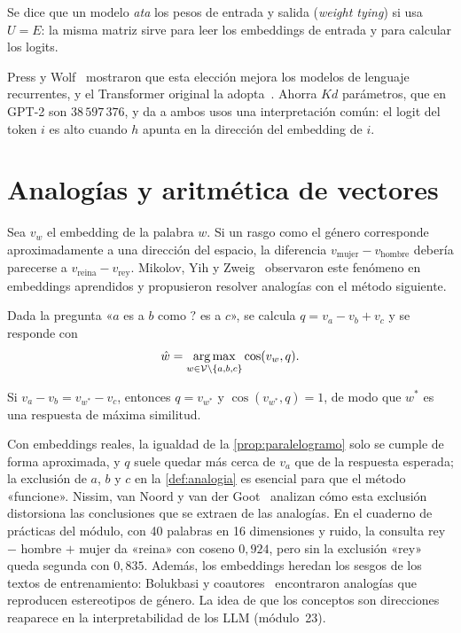 \begin{definicion}
Se dice que un modelo \emph{ata} los pesos de entrada y salida (\emph{weight tying}) si usa $U=E$: la misma matriz sirve para leer los embeddings de entrada y para calcular los logits.
\end{definicion}

Press y Wolf~\cite{press} mostraron que esta elección mejora los modelos de lenguaje recurrentes, y el Transformer original la adopta~\cite[§3.4]{vaswani}. Ahorra $Kd$ parámetros, que en GPT-2 son $38\,597\,376$, y da a ambos usos una interpretación común: el logit del token $i$ es alto cuando $h$ apunta en la dirección del embedding de $i$.

\section{Analogías y aritmética de vectores}

Sea $v_w$ el embedding de la palabra $w$. Si un rasgo como el género corresponde aproximadamente a una dirección del espacio, la diferencia $v_{\text{mujer}}-v_{\text{hombre}}$ debería parecerse a $v_{\text{reina}}-v_{\text{rey}}$. Mikolov, Yih y Zweig~\cite{mikolov-b} observaron este fenómeno en embeddings aprendidos y propusieron resolver analogías con el método siguiente.

\begin{definicion}\label{def:analogia}
Dada la pregunta «$a$ es a $b$ como $?$ es a $c$», se calcula $q=v_a-v_b+v_c$ y se responde con
\[
\hat w=\operatorname*{arg\,max}_{w\in\mathcal{V}\setminus\{a,b,c\}}\cos(v_w,q).
\]
\end{definicion}

\begin{proposicion}\label{prop:paralelogramo}
Si $v_a-v_b=v_{w^{*}}-v_c$, entonces $q=v_{w^{*}}$ y $\cos(v_{w^{*}},q)=1$, de modo que $w^{*}$ es una respuesta de máxima similitud.
\end{proposicion}

\addtocounter{definicion}{1}%

\begin{observacion}[Limitaciones]
Con embeddings reales, la igualdad de la \cref{prop:paralelogramo} solo se cumple de forma aproximada, y $q$ suele quedar más cerca de $v_a$ que de la respuesta esperada; la exclusión de $a$, $b$ y $c$ en la \cref{def:analogia} es esencial para que el método «funcione». Nissim, van Noord y van der Goot~\cite{nissim} analizan cómo esta exclusión distorsiona las conclusiones que se extraen de las analogías. En el cuaderno de prácticas del módulo, con 40 palabras en 16 dimensiones y ruido, la consulta rey $-$ hombre $+$ mujer da «reina» con coseno $0{,}924$, pero sin la exclusión «rey» queda segunda con $0{,}835$. Además, los embeddings heredan los sesgos de los textos de entrenamiento: Bolukbasi y coautores~\cite{bolukbasi} encontraron analogías que reproducen estereotipos de género. La idea de que los conceptos son direcciones reaparece en la interpretabilidad de los LLM (módulo~23).
\end{observacion}

